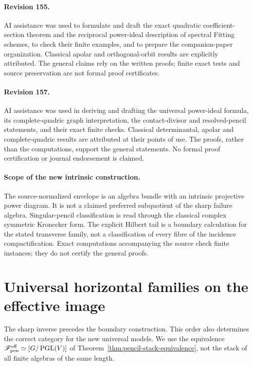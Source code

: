 \documentclass[11pt,reqno]{amsart}
\numberwithin{equation}{section}
\theoremstyle{definition}\newtheorem{definition}[theorem]{Definition}
\theoremstyle{remark}\newtheorem{remark}[theorem]{Remark}
\begin{document}
\paragraph{Revision 155.}
AI assistance was used to formulate and draft the exact quadratic
coefficient-section theorem and the reciprocal power-ideal description
of spectral Fitting schemes, to check their finite examples, and to
prepare the companion-paper organization.  Classical apolar and
orthogonal-orbit results are explicitly attributed.  The general
claims rely on the written proofs; finite exact tests and source
preservation are not formal proof certificates.

\paragraph{Revision 157.}
AI assistance was used in deriving and drafting the universal power-ideal
formula, its complete-quadric graph interpretation, the contact-divisor
and resolved-pencil statements, and their exact finite checks. Classical
determinantal, apolar and complete-quadric results are attributed at their
points of use. The proofs, rather than the computations, support the
general statements. No formal proof certification or journal endorsement
is claimed.

\paragraph{Scope of the new intrinsic construction.}
The source-normalized envelope is an algebra bundle with an intrinsic
projective power diagram. It is not a claimed preferred subquotient
of the sharp failure algebra. Singular-pencil classification is read
through the classical complex symmetric Kronecker form. The explicit
Hilbert tail is a boundary calculation for the stated transverse
family, not a classification of every fibre of the incidence
compactification. Exact computations accompanying the source check
finite instances; they do not certify the general proofs.
\section{Universal horizontal families on the effective image}
\label{sec:effective-horizontal-v166}
The sharp inverse precedes the boundary construction. This order
also determines the correct category for the new universal models.
We use the equivalence
$\mathscr F_{\rm pen}^{\rm eff}\simeq[G/\operatorname{PGL}(V)]$
of Theorem~\ref{thm:pencil-stack-equivalence}, not the stack of all
finite algebras of the same length.
\end{document}
